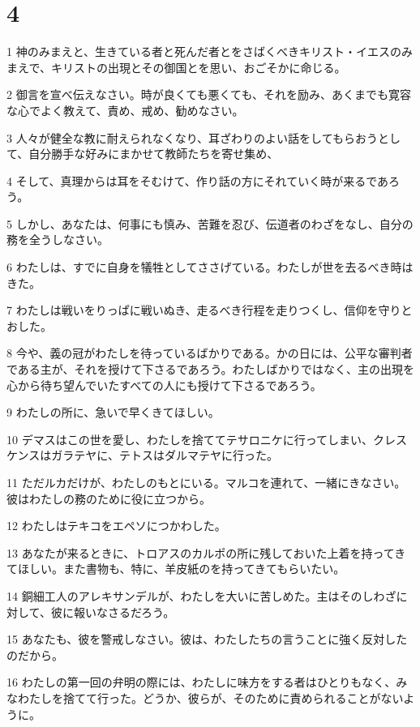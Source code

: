 \chapter{4}

\par 1 神のみまえと、生きている者と死んだ者とをさばくべきキリスト・イエスのみまえで、キリストの出現とその御国とを思い、おごそかに命じる。
\par 2 御言を宣べ伝えなさい。時が良くても悪くても、それを励み、あくまでも寛容な心でよく教えて、責め、戒め、勧めなさい。
\par 3 人々が健全な教に耐えられなくなり、耳ざわりのよい話をしてもらおうとして、自分勝手な好みにまかせて教師たちを寄せ集め、
\par 4 そして、真理からは耳をそむけて、作り話の方にそれていく時が来るであろう。
\par 5 しかし、あなたは、何事にも慎み、苦難を忍び、伝道者のわざをなし、自分の務を全うしなさい。
\par 6 わたしは、すでに自身を犠牲としてささげている。わたしが世を去るべき時はきた。
\par 7 わたしは戦いをりっぱに戦いぬき、走るべき行程を走りつくし、信仰を守りとおした。
\par 8 今や、義の冠がわたしを待っているばかりである。かの日には、公平な審判者である主が、それを授けて下さるであろう。わたしばかりではなく、主の出現を心から待ち望んでいたすべての人にも授けて下さるであろう。
\par 9 わたしの所に、急いで早くきてほしい。
\par 10 デマスはこの世を愛し、わたしを捨ててテサロニケに行ってしまい、クレスケンスはガラテヤに、テトスはダルマテヤに行った。
\par 11 ただルカだけが、わたしのもとにいる。マルコを連れて、一緒にきなさい。彼はわたしの務のために役に立つから。
\par 12 わたしはテキコをエペソにつかわした。
\par 13 あなたが来るときに、トロアスのカルポの所に残しておいた上着を持ってきてほしい。また書物も、特に、羊皮紙のを持ってきてもらいたい。
\par 14 銅細工人のアレキサンデルが、わたしを大いに苦しめた。主はそのしわざに対して、彼に報いなさるだろう。
\par 15 あなたも、彼を警戒しなさい。彼は、わたしたちの言うことに強く反対したのだから。
\par 16 わたしの第一回の弁明の際には、わたしに味方をする者はひとりもなく、みなわたしを捨てて行った。どうか、彼らが、そのために責められることがないように。
